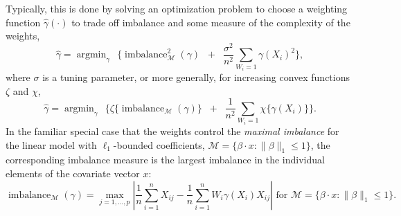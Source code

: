\documentclass{article}
\DeclareMathOperator*{\argmin}{argmin}
\theoremstyle{definition}
\newcommand{\dispersion}{\chi}
\newcommand{\imbalancescale}{\zeta}
\DeclareMathOperator{\imbalance}{imbalance}
\newcommand{\hgamma}{\ensuremath{\hat\gamma}}
\newcommand{\model}{\mathcal{M}}
\newcommand{\<}{\langle}
\renewcommand{\>}{\rangle}
\begin{document}
Typically, this is done by solving an optimization problem to choose a weighting function $\hgamma(\cdot)$ to trade off imbalance  and some measure of the complexity of the weights,
\begin{equation}
\label{eq_balancing-weights}
 \hgamma = \mathop{\argmin}_{\gamma}~~ \Bigg\{ \imbalance_{\model}^2(\gamma) \;\;+\;\; \frac{\sigma^2}{n^2} \sum_{W_i=1}\gamma(X_i)^2  \Bigg\},
\end{equation}
\noindent where $\sigma$ is a tuning parameter,
 or more generally, for increasing convex functions $\imbalancescale$ and $\dispersion$,
\begin{equation}
\label{eq_balancing-weights-general}
 \hgamma = \mathop{\argmin}_{\gamma}~~ \Bigg\{ \imbalancescale\{\imbalance_{\model}(\gamma)\} \;\;+\;\; \frac{1}{n^2} \sum_{W_i=1}\dispersion\{\gamma(X_i)\}  \Bigg\}.
\end{equation}
\noindent In the familiar special case that the weights control the \emph{maximal imbalance} for the linear model with $\ell_1$-bounded coefficients, $\model = \{\beta \cdot x  : \|\beta\|_1 \leq 1\}$,
the corresponding imbalance measure is the largest  imbalance in the individual elements of the covariate vector $x$:
\begin{equation} \label{eq:sbw}
\imbalance_{\model}(\gamma) = \max_{j=1,\ldots,p} \left| \frac{1}{n} \sum_{i=1}^n X_{ij} - \frac{1}{n}\sum_{i=1}^n W_i \gamma(X_i) X_{ij} \right| \text{ for }
\model = \{\beta \cdot x : \|\beta\|_1 \leq 1\}.
\end{equation}
\end{document}
